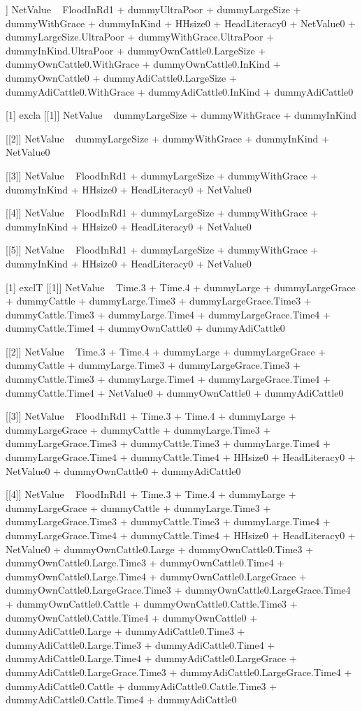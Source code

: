 \begin{Schunk}
\begin{Soutput}
[[5]]
NetValue ~ FloodInRd1 + dummyUltraPoor + dummyLargeSize + dummyWithGrace + 
    dummyInKind + HHsize0 + HeadLiteracy0 + NetValue0 + dummyLargeSize.UltraPoor + 
    dummyWithGrace.UltraPoor + dummyInKind.UltraPoor + dummyOwnCattle0.LargeSize + 
    dummyOwnCattle0.WithGrace + dummyOwnCattle0.InKind + dummyOwnCattle0 + 
    dummyAdiCattle0.LargeSize + dummyAdiCattle0.WithGrace + dummyAdiCattle0.InKind + 
    dummyAdiCattle0

[1] excla
[[1]]
NetValue ~ dummyLargeSize + dummyWithGrace + dummyInKind

[[2]]
NetValue ~ dummyLargeSize + dummyWithGrace + dummyInKind + NetValue0

[[3]]
NetValue ~ FloodInRd1 + dummyLargeSize + dummyWithGrace + dummyInKind + 
    HHsize0 + HeadLiteracy0 + NetValue0

[[4]]
NetValue ~ FloodInRd1 + dummyLargeSize + dummyWithGrace + dummyInKind + 
    HHsize0 + HeadLiteracy0 + NetValue0

[[5]]
NetValue ~ FloodInRd1 + dummyLargeSize + dummyWithGrace + dummyInKind + 
    HHsize0 + HeadLiteracy0 + NetValue0

[1] exclT
[[1]]
NetValue ~ Time.3 + Time.4 + dummyLarge + dummyLargeGrace + dummyCattle + 
    dummyLarge.Time3 + dummyLargeGrace.Time3 + dummyCattle.Time3 + 
    dummyLarge.Time4 + dummyLargeGrace.Time4 + dummyCattle.Time4 + 
    dummyOwnCattle0 + dummyAdiCattle0

[[2]]
NetValue ~ Time.3 + Time.4 + dummyLarge + dummyLargeGrace + dummyCattle + 
    dummyLarge.Time3 + dummyLargeGrace.Time3 + dummyCattle.Time3 + 
    dummyLarge.Time4 + dummyLargeGrace.Time4 + dummyCattle.Time4 + 
    NetValue0 + dummyOwnCattle0 + dummyAdiCattle0

[[3]]
NetValue ~ FloodInRd1 + Time.3 + Time.4 + dummyLarge + dummyLargeGrace + 
    dummyCattle + dummyLarge.Time3 + dummyLargeGrace.Time3 + 
    dummyCattle.Time3 + dummyLarge.Time4 + dummyLargeGrace.Time4 + 
    dummyCattle.Time4 + HHsize0 + HeadLiteracy0 + NetValue0 + 
    dummyOwnCattle0 + dummyAdiCattle0

[[4]]
NetValue ~ FloodInRd1 + Time.3 + Time.4 + dummyLarge + dummyLargeGrace + 
    dummyCattle + dummyLarge.Time3 + dummyLargeGrace.Time3 + 
    dummyCattle.Time3 + dummyLarge.Time4 + dummyLargeGrace.Time4 + 
    dummyCattle.Time4 + HHsize0 + HeadLiteracy0 + NetValue0 + 
    dummyOwnCattle0.Large + dummyOwnCattle0.Time3 + dummyOwnCattle0.Large.Time3 + 
    dummyOwnCattle0.Time4 + dummyOwnCattle0.Large.Time4 + dummyOwnCattle0.LargeGrace + 
    dummyOwnCattle0.LargeGrace.Time3 + dummyOwnCattle0.LargeGrace.Time4 + 
    dummyOwnCattle0.Cattle + dummyOwnCattle0.Cattle.Time3 + dummyOwnCattle0.Cattle.Time4 + 
    dummyOwnCattle0 + dummyAdiCattle0.Large + dummyAdiCattle0.Time3 + 
    dummyAdiCattle0.Large.Time3 + dummyAdiCattle0.Time4 + dummyAdiCattle0.Large.Time4 + 
    dummyAdiCattle0.LargeGrace + dummyAdiCattle0.LargeGrace.Time3 + 
    dummyAdiCattle0.LargeGrace.Time4 + dummyAdiCattle0.Cattle + 
    dummyAdiCattle0.Cattle.Time3 + dummyAdiCattle0.Cattle.Time4 + 
    dummyAdiCattle0


\end{Soutput}
\end{Schunk}
